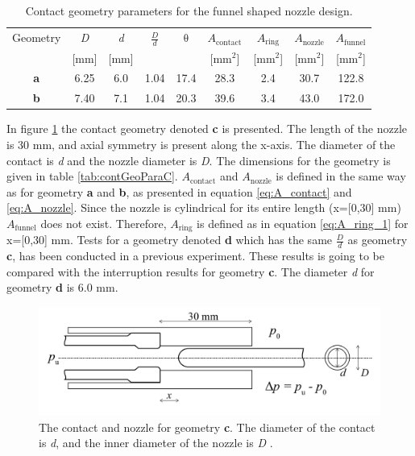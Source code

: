 \documentclass[10pt,b5paper,twoside]{article}
\begin{document}
\begin{table}[H]
\center
\caption{Contact geometry parameters for the funnel shaped nozzle design.}
 \begin{tabular}{|c|c|c|c|c|c|c|c|c|}
\hline 
Geometry & \textit{D} & \textit{d}  & $\frac{D}{d}$ & $\mathrm{\theta}$ & $A_\mathrm{{contact}}$ & $A_\mathrm{{ring}}$  & $A_\mathrm{{nozzle}}$ & $A_\mathrm{{funnel}}$ \\
  & [mm] &  [mm] &   &   &   [mm$^2$] &  [mm$^2$] &   [mm$^2$] &   [mm$^2$]\\
\hline 
\textbf{a} & 6.25 & 6.0 & 1.04 & 17.4 & 28.3 & 2.4 & 30.7 & 122.8\\ 
\hline 
\textbf{b} & 7.40 & 7.1 & 1.04 & 20.3 & 39.6 & 3.4 & 43.0 & 172.0\\ 
\hline 
\end{tabular} 
\label{tab:contGeoPara}
\end{table}

In figure \ref{fig:contactAndNozzleC} the contact geometry denoted \textbf{c} is presented. The length of the nozzle is 30 mm, and axial symmetry is present along the x-axis. The diameter of the contact is \textit{d} and the nozzle diameter is \textit{D}. The dimensions for the geometry is given in table \ref{tab:contGeoParaC}. $A_\mathrm{{contact}}$ and $A_\mathrm{{nozzle}}$ is defined in the same way as for geometry \textbf{a} and \textbf{b}, as presented in equation \eqref{eq:A_contact} and \eqref{eq:A_nozzle}. Since the nozzle is cylindrical for its entire length (x=[0,30] mm) $A_\mathrm{{funnel}}$ does not exist. Therefore, $A_\mathrm{{ring}}$ is defined as in equation \eqref{eq:A_ring_1} for x=[0,30] mm. Tests for a geometry denoted \textbf{d} which has the same $\frac{D}{d}$ as geometry \textbf{c}, has been conducted in a previous experiment. These results is going to be compared with the interruption results for geometry \textbf{c}. The diameter \textit{d} for geometry \textbf{d} is 6.0 mm.

\begin{figure} [H]
\centering
\includegraphics[scale=0.3]{Bilder/Method/contactSetUp.png}
\caption{The contact and nozzle for geometry \textbf{c}. The diameter of the contact is \textit{d}, and the inner diameter of the nozzle is \textit{D} \cite{bib:AFIMVLBA}.} \label{fig:contactAndNozzleC}
\end{figure}
\end{document}
